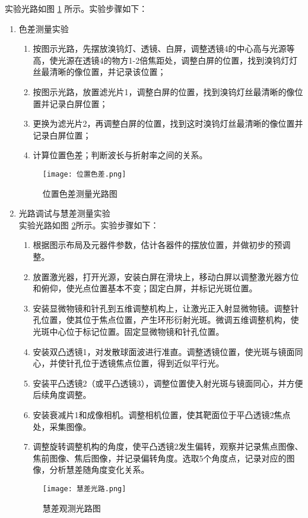 \documentclass[dvipsnames, svgnames,a4paper,11pt]{article}
\begin{document}
	
	实验光路如图 \ref{位置色差} 所示。实验步骤如下：
	\begin{enumerate}
\item 色差测量实验

	\begin{enumerate}
		\item 按图示光路，先摆放溴钨灯、透镜、白屏，调整透镜4的中心高与光源等高，使光源在透镜4的物方1-2倍焦距处，调整白屏的位置，找到溴钨灯灯丝最清晰的像位置，并记录该位置；
		\item 按图示光路，放置滤光片1，调整白屏的位置，找到溴钨灯丝最清晰的像位置并记录白屏位置；
		\item 更换为滤光片2，再调整白屏的位置，找到这时溴钨灯丝最清晰的像位置并记录白屏位置；
		\item 计算位置色差；判断波长与折射率之间的关系。
	\end{enumerate}
	\begin{figure}[H]
		\centering
		\texttt{[image: 位置色差.png]}
		\caption{位置色差测量光路图}
		\label{位置色差}
	\end{figure}
	\item 光路调试与慧差测量实验\\
	实验光路如图 \ref{慧差}所示。实验步骤如下：
	\begin{enumerate}
		\item 根据图示布局及元器件参数，估计各器件的摆放位置，并做初步的预调整。
		\item 放置激光器，打开光源，安装白屏在滑块上，移动白屏以调整激光器方位和俯仰，使光点位置基本不变；固定白屏，并标记光斑位置。
		\item 安装显微物镜和针孔到五维调整机构上，让激光正入射显微物镜。调整针孔位置，使其位于焦点位置，产生环形衍射光斑。微调五维调整机构，使光斑中心位于标记位置。固定显微物镜和针孔位置。
		\item 安装双凸透镜1，对发散球面波进行准直。调整透镜位置，使光斑与镜面同心，并使针孔位于透镜焦点位置，得到近似平行光。
		\item 安装平凸透镜2（或平凸透镜3），调整位置使入射光斑与镜面同心，并方便后续角度调整。
		\item 安装衰减片1和成像相机。调整相机位置，使其靶面位于平凸透镜2焦点处，采集图像。
		\item 调整旋转调整机构的角度，使平凸透镜2发生偏转，观察并记录焦点图像、焦前图像、焦后图像，并记录偏转角度。选取5个角度点，记录对应的图像，分析慧差随角度变化关系。
		
	\end{enumerate}
	\begin{figure}[H]
		\centering
		\texttt{[image: 慧差光路.png]}
		\caption{慧差观测光路图}
		\label{慧差}
	\end{figure}
\end{enumerate}
\end{document}
